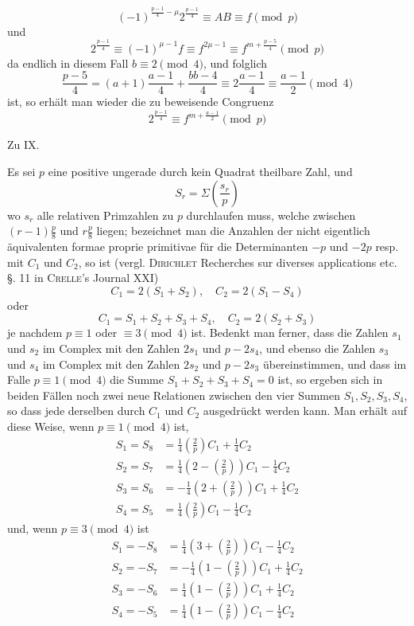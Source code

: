 %
\[
(-1)^{\frac{p-1}4-\mu}2^{\frac{p-1}4}\equiv AB\equiv f\pmod p
\]
und
\[
2^{\frac{p-1}4}\equiv(-1)^{\mu-1}f\equiv f^{2\mu-1}\equiv f^{m+\frac{p-5}4}\pmod p
\]
da endlich in diesem Fall $b\equiv2\pmod4$, und folglich
\[
\frac{p-5}4=(a+1)\frac{a-1}4+\frac{bb-4}4\equiv2\frac{a-1}4\equiv\frac{a-1}2\pmod4
\]
ist, so erhält man wieder die zu beweisende Congruenz
\[
2^{\frac{p-1}4}\equiv f^{m+\frac{a-1}2}\pmod p
\]
\BookRule{35mm}

\begin{center}\large Zu IX.\end{center}

Es sei $p$ eine positive ungerade durch kein Quadrat theilbare Zahl, und
\[
S_r=\Sigma\left(\frac{s_r}p\right)
\]
wo $s_r$ alle relativen Primzahlen zu $p$ durchlaufen muss, welche zwischen $(r-1)\frac p8$ und $r\frac p8$ liegen; bezeichnet man die Anzahlen der nicht eigentlich äquivalenten formae proprie primitivae für die Determinanten $-p$ und $-2p$ resp. mit $C_1$ und $C_2$, so ist (vergl. \textsc{Dirichlet} Recherches sur diverses applications etc. §. 11 in \textsc{Crelle}'s Journal XXI)
\[
C_1=2(S_1+S_2),\quad C_2=2(S_1-S_4)
\]
oder
\[
C_1=S_1+S_2+S_3+S_4,\quad C_2=2(S_2+S_3)
\]
je nachdem $p\equiv1$ oder $\equiv3\pmod4$ ist. Bedenkt man ferner, dass die Zahlen $s_1$ und $s_2$ im Complex mit den Zahlen $2s_1$ und $p-2s_4$, und ebenso die Zahlen $s_3$ und $s_4$ im Complex mit den Zahlen $2s_2$ und $p-2s_3$ übereinstimmen, und dass im Falle $p\equiv1\pmod4$ die Summe $S_1+S_2+S_3+S_4=0$ ist, so ergeben sich in beiden Fällen noch zwei neue Relationen zwischen den vier Summen $S_1,S_2,S_3,S_4$, so dass jede derselben durch $C_1$ und $C_2$ ausgedrückt werden kann. Man erhält auf diese Weise, wenn $p\equiv1\pmod4$ ist,
\[
\begin{aligned}
S_1=S_8&=\tfrac14\left(\frac2p\right)C_1+\tfrac14C_2\\
S_2=S_7&=\tfrac14\left(2-\left(\frac2p\right)\right)C_1-\tfrac14C_2\\
S_3=S_6&=-\tfrac14\left(2+\left(\frac2p\right)\right)C_1+\tfrac14C_2\\
S_4=S_5&=\tfrac14\left(\frac2p\right)C_1-\tfrac14C_2
\end{aligned}
\]
%
und, wenn $p\equiv3\pmod4$ ist
\[
\begin{aligned}
S_1=-S_8&=\tfrac14\left(3+\left(\frac2p\right)\right)C_1-\tfrac14C_2\\
S_2=-S_7&=-\tfrac14\left(1-\left(\frac2p\right)\right)C_1+\tfrac14C_2\\
S_3=-S_6&=\tfrac14\left(1-\left(\frac2p\right)\right)C_1+\tfrac14C_2\\
S_4=-S_5&=\tfrac14\left(1-\left(\frac2p\right)\right)C_1-\tfrac14C_2
\end{aligned}
\]

